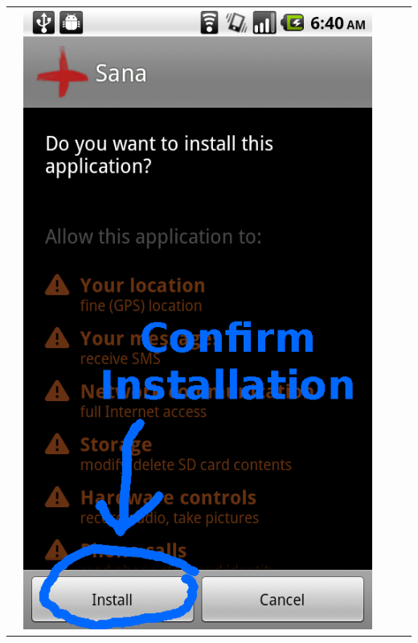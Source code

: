 \documentclass[a4paper,10pt]{article}
\begin{document}
\begin{flushleft}
\begin{tabular}{ c c c c c }
&\includegraphics[scale=0.15,keepaspectratio=true]{client_install_confirmation.png}

\end{tabular}
\end{flushleft}
\end{document}
